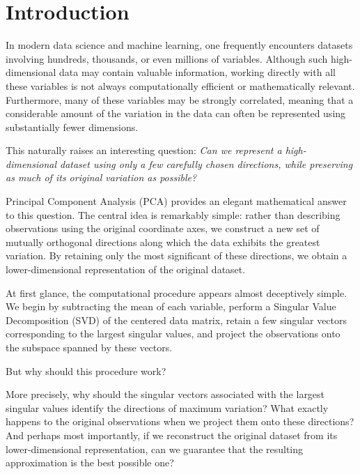 \documentclass[11pt]{article}
\begin{document}
\tableofcontents
\newpage



\section{Introduction}

In modern data science and machine learning, one frequently
encounters datasets involving hundreds, thousands, or even
millions of variables. Although such high-dimensional data
may contain valuable information, working directly with
all these variables is not always computationally efficient
or mathematically relevant. Furthermore, many of
these variables may be strongly correlated, meaning that
a considerable amount of the variation in the data can
often be represented using substantially fewer dimensions.

This naturally raises an interesting question:
\textit{Can we represent a high-dimensional dataset
using only a few carefully chosen directions, while
preserving as much of its original variation as possible?}

Principal Component Analysis (PCA) provides an elegant
mathematical answer to this question. The central idea
is remarkably simple: rather than describing observations
using the original coordinate axes, we construct a new
set of mutually orthogonal directions along which the
data exhibits the greatest variation. By retaining only
the most significant of these directions, we obtain
a lower-dimensional representation of the original
dataset.

At first glance, the computational procedure appears
almost deceptively simple. We begin by subtracting
the mean of each variable, perform a Singular Value
Decomposition (SVD) of the centered data matrix, retain
a few singular vectors corresponding to the largest
singular values, and project the observations onto
the subspace spanned by these vectors.

But why should this procedure work?

More precisely, why should the singular vectors
associated with the largest singular values identify
the directions of maximum variation? What exactly
happens to the original observations when we project
them onto these directions? And perhaps most
importantly, if we reconstruct the original dataset
from its lower-dimensional representation, can
we guarantee that the resulting approximation is
the best possible one?
\end{document}
